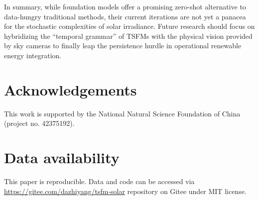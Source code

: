 \documentclass[number, 3p, 10pt, times]{elsarticle}
\begin{document}
In summary, while foundation models offer a promising zero-shot alternative to data-hungry traditional methods, their current iterations are not yet a panacea for the stochastic complexities of solar irradiance. Future research should focus on hybridizing the ``temporal grammar'' of TSFMs with the physical vision provided by sky cameras to finally leap the persistence hurdle in operational renewable energy integration.


\section*{Acknowledgements}
This work is supported by the National Natural Science Foundation of China (project no. 42375192).

\section*{Data availability}
This paper is reproducible. Data and code can be accessed via \url{https://gitee.com/dazhiyang/tsfm-solar} repository on Gitee under MIT license.







\end{document}
